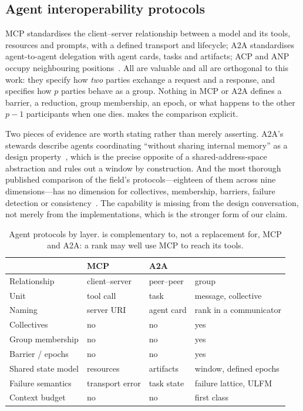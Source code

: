 \subsection{Agent interoperability protocols}

MCP standardises the client--server relationship between a model and its
tools, resources and prompts, with a defined transport and lifecycle;
A2A standardises agent-to-agent delegation with agent cards, tasks and
artifacts; ACP and ANP occupy neighbouring
positions~\cite{mcpblog2026,a2adocs2026v1,ibm2026acp,ehtesham2025survey,ehtesham2025survey}.
All are valuable and all are orthogonal to this work: they specify how
\emph{two} parties exchange a request and a response, and \ampi{} specifies
how \emph{$p$} parties behave as a group. Nothing in MCP or A2A defines a
barrier, a reduction, group membership, an epoch, or what happens to the
other $p-1$ participants when one dies.  makes the
comparison explicit.

Two pieces of evidence are worth stating rather than merely asserting.
A2A's stewards describe agents coordinating ``without sharing internal
memory'' as a design property~\cite{a2adocs2026v1}, which is the precise
opposite of a shared-address-space abstraction and rules out a window by
construction. And the most thorough published comparison of the field's
protocols---eighteen of them across nine dimensions---has no dimension for
collectives, membership, barriers, failure detection or
consistency~\cite{ehtesham2025survey}. The capability is missing from the
design conversation, not merely from the implementations, which is the
stronger form of our claim.

\begin{table}[t]
\centering\small
\caption{Agent protocols by layer. \ampi{} is complementary to, not a
replacement for, MCP and A2A: a rank may well use MCP to reach its tools.}
\label{tab:protocols}
\begin{tabular}{@{}llll@{}}
\toprule
 & \textbf{MCP} & \textbf{A2A} & \textbf{\ampi{}}\\
\midrule
Relationship & client--server & peer--peer & group\\
Unit         & tool call & task & message, collective\\
Naming       & server URI & agent card & rank in a communicator\\
Collectives  & no & no & yes\\
Group membership & no & no & yes\\
Barrier / epochs & no & no & yes\\
Shared state model & resources & artifacts & window, defined epochs\\
Failure semantics & transport error & task state & failure lattice, ULFM\\
Context budget & no & no & first class\\
\bottomrule
\end{tabular}
\end{table}

